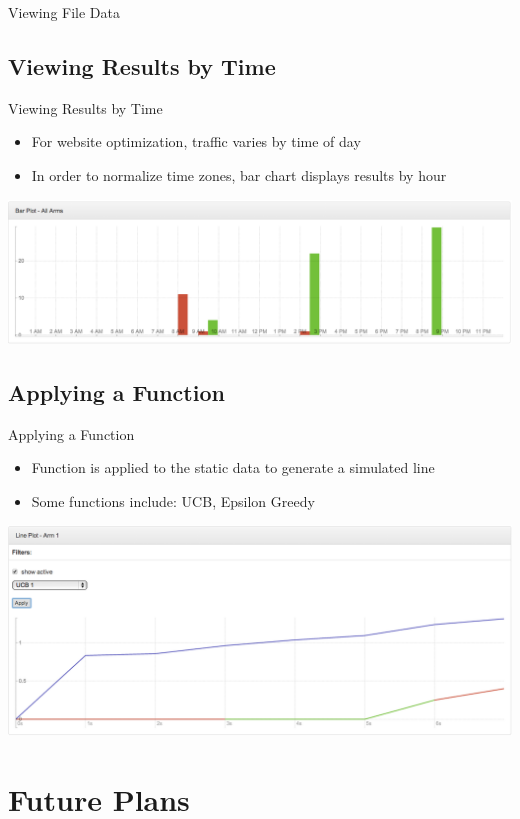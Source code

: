 \documentclass{beamer}
\begin{document}
\begin{frame}{Viewing File Data}
\subsection{Viewing Results by Time}
\begin{frame}{Viewing Results by Time}
\begin{itemize}
\item For website optimization, traffic varies by time of day
\item In order to normalize time zones, bar chart displays results by hour
\end{itemize}
\includegraphics[scale=0.25]{barcharttime.png}
\end{frame}

\subsection{Applying a Function}
\begin{frame}{Applying a Function}
\begin{itemize}
\item Function is applied to the static data to generate a simulated line
\item Some functions include: UCB, Epsilon Greedy
\end{itemize}
\includegraphics[scale=0.25]{linechartfunction.png}
\end{frame}

\section{Future Plans}


\end{frame}
\end{document}
